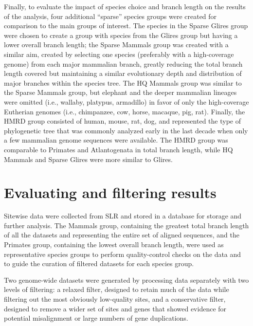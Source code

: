 Finally, to evaluate the impact of species choice and branch length on
the results of the \sw analysis, four additional ``sparse'' species
groups were created for comparison to the main groups of interest. The
species in the Sparse Glires group were chosen to create a group with
species from the Glires group but having a lower overall branch
length; the Sparse Mammals group was created with a similar aim,
created by selecting one species (preferably with a high-coverage
genome) from each major mammalian branch, greatly reducing the total
branch length covered but maintaining a similar evolutionary depth and
distribution of major branches within the species tree. The HQ Mammals
group was similar to the Sparse Mammals group, but elephant and the
deeper mammalian lineages were omitted (i.e., wallaby, platypus,
armadillo) in favor of only the high-coverage Eutherian genomes (i.e.,
chimpanzee, cow, horse, macaque, pig, rat). Finally, the HMRD group
consisted of human, mouse, rat, dog, and represented the type of
phylogenetic tree that was commonly analyzed early in the last decade
when only a few mammalian genome sequences were available. The HMRD
group was comparable to Primates and Atlantogenata in total branch
length, while HQ Mammals and Sparse Glires were more similar to
Glires.

\section{Evaluating and filtering \sw results}
\label{section_sitewise_filtering}

Sitewise data were collected from SLR and stored in a database for
storage and further analysis. The Mammals group, containing the
greatest total branch length of all the datasets and representing the
entire set of aligned sequences, and the Primates group, containing
the lowest overall branch length, were used as representative species
groups to perform quality-control checks on the \sw data and to guide
the curation of filtered \sw datasets for each species group.

Two genome-wide datasets were generated by processing \sw data
separately with two levels of filtering: a relaxed filter, designed to
retain much of the data while filtering out the most obviously
low-quality sites, and a conservative filter, designed to remove a
wider set of sites and genes that showed evidence for potential
misalignment or large numbers of gene duplications.

